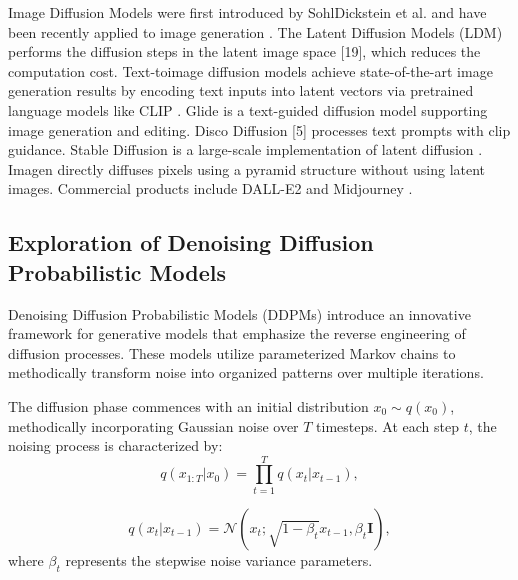 Image Diffusion Models were first introduced by SohlDickstein et al. 
\cite*{Sohl-Dickstein2015,kingma2021variational} and have been recently applied to
image generation \cite*{dhariwal2021diffusion,}. The Latent Diffusion Models
(LDM) \cite*{LDM} performs the diffusion steps in the latent image
space [19], which reduces the computation cost. Text-toimage diffusion models achieve state-of-the-art image generation results by encoding text inputs into latent vectors
via pretrained language models like CLIP \cite*{CLIP}. Glide \cite*{glide}
is a text-guided diffusion model supporting image generation and editing. Disco Diffusion [5] processes text prompts
with clip guidance. Stable Diffusion \cite*{stablediffusionv15} is a large-scale
implementation of latent diffusion \cite*{LDM}. Imagen \cite*{saharia2022photorealistic} directly
diffuses pixels using a pyramid structure without using latent
images. Commercial products include DALL-E2 \cite*{openai2023dalle2} and
Midjourney \cite*{midjourney2023}.




\subsection{Exploration of Denoising Diffusion Probabilistic Models}

Denoising Diffusion Probabilistic Models (DDPMs) \cite*{DDPM} introduce an innovative framework for generative models that emphasize the reverse engineering of diffusion processes. These models utilize parameterized Markov chains to methodically transform noise into organized patterns over multiple iterations.

The diffusion phase commences with an initial distribution \(x_0 \sim q(x_0)\), methodically incorporating Gaussian noise over \(T\) timesteps. At each step \(t\), the noising process is characterized by:
\begin{equation}
q(x_{1:T}|x_0) = \prod_{t=1}^{T} q(x_t|x_{t-1}),
\end{equation}

\begin{equation}
q(x_t|x_{t-1}) = \mathcal{N}(x_t; \sqrt{1-\beta_t}x_{t-1}, \beta_t\mathbf{I}),
\end{equation}
where \( \beta_t \) represents the stepwise noise variance parameters.

